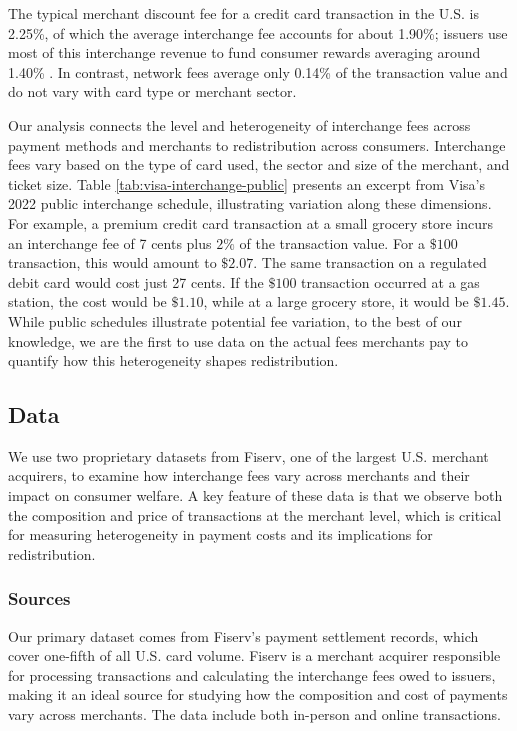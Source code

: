\documentclass[11pt,english]{article}
\theoremstyle{remark}
\begin{document}
The typical merchant discount fee for a credit card transaction in the U.S. is 2.25\%, of which the average interchange fee accounts for about 1.90\%; issuers use most of this interchange revenue to fund consumer rewards averaging around 1.40\% \citep{Nilson2023,Drechsler.etal2025}.
In contrast, network fees average only 0.14\% of the transaction value and do not vary with card type or merchant sector.

Our analysis connects the level and heterogeneity of interchange fees across payment methods and merchants to redistribution across consumers.
Interchange fees vary based on the type of card used, the sector and size of the merchant, and ticket size.
Table \ref{tab:visa-interchange-public} presents an excerpt from Visa's 2022 public interchange schedule, illustrating variation along these dimensions.
For example, a premium credit card transaction at a small grocery store incurs an interchange fee of 7 cents plus $2\%$ of the transaction value.
For a $\$100$ transaction, this would amount to $\$2.07$.
The same transaction on a regulated debit card would cost just 27 cents.
If the $\$100$ transaction occurred at a gas station, the cost would be $\$1.10$, while at a large grocery store, it would be $\$1.45$.
While public schedules illustrate potential fee variation, to the best of our knowledge, we are the first to use data on the actual fees merchants pay to quantify how this heterogeneity shapes redistribution.

\subsection{Data}

We use two proprietary datasets from Fiserv, one of the largest U.S. merchant acquirers, to examine how interchange fees vary across merchants and their impact on consumer welfare.
A key feature of these data is that we observe both the composition and price of transactions at the merchant level, which is critical for measuring heterogeneity in payment costs and its implications for redistribution.

\subsubsection{Sources}

Our primary dataset comes from Fiserv's payment settlement records, which cover one-fifth of all U.S. card volume.
Fiserv is a merchant acquirer responsible for processing transactions and calculating the interchange fees owed to issuers, making it an ideal source for studying how the composition and cost of payments vary across merchants.
The data include both in-person and online transactions.
\end{document}
